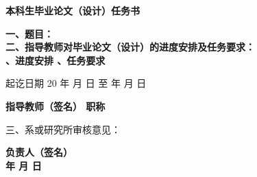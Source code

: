 \newpage{}

\begin{center}
  {\bfseries\hwxk{} 本科生毕业论文（设计）任务书}
\end{center}

{
    \bfseries
    \noindent 一、题目：\\
    \noindent 二、指导教师对毕业论文（设计）的进度安排及任务要求：\\
    、进度安排
    \vskip 60mm
    、任务要求
    \vskip 40mm

    \noindent 起讫日期 20 \quad 年 \quad  月 \quad  日 \quad 至  \quad  年 \quad  月  \quad 日
    \begin{flushright}
        \bfseries {}
            指导教师（签名） \uwave{\quad\quad\quad\quad\quad}
            职称 \uwave{\quad\quad\quad\quad\quad}
    \end{flushright}

    \noindent 三、系或研究所审核意见：\\

    \mbox{} \vfill
    \begin{flushright}
      \bfseries {}
      负责人（签名） \uwave{\quad\quad\quad\quad\quad} \\
      \quad 年 \quad 月 \quad 日
    \end{flushright}
}
